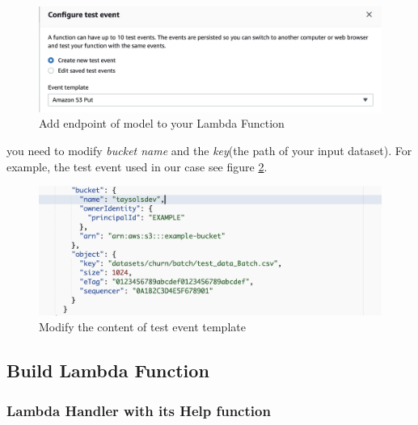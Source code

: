 \documentclass[12pt]{article}
\begin{document}
\begin{figure}[H]
\centering
\begin{minipage}{1\textwidth}
  \centering
  \includegraphics[width=1\linewidth]{configure_test_event_1.png}
   \caption{Add endpoint of model to your Lambda Function}
   \label{fig:configure_test_event_1}
\end{minipage}%
\end{figure}
\noindent
you need to modify \textit{bucket name} and the \textit{key}(the path of your input dataset). For example, the test event used in our case see figure \ref{fig:configure_test_event_2}. 

\begin{figure}[H]
\centering
\begin{minipage}{1\textwidth}
  \centering
  \includegraphics[width=1\linewidth]{configure_test_event_2.png}
   \caption{Modify the content of test event template}
   \label{fig:configure_test_event_2}
\end{minipage}%
\end{figure}


\subsection{Build Lambda Function}

\subsubsection{Lambda Handler with its Help function}
\end{document}
